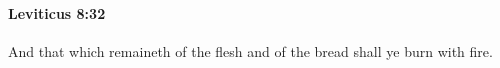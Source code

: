 
		\paragraph{Leviticus 8:32} %
			\label{LEVITICUS-8-32}

			And that which remaineth of the flesh and of the bread shall ye burn with fire.



